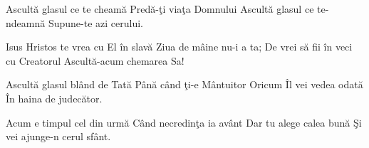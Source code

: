 
\beginverse
Ascultă glasul ce te cheamă
Predă-ţi viaţa Domnului
Ascultă glasul ce te-ndeamnă
Supune-te azi cerului.
\endverse

\beginchorus
Isus Hristos te vrea cu El în slavă
Ziua de mâine nu-i a ta;
De vrei să fii în veci cu Creatorul
Ascultă-acum chemarea Sa!
\endchorus

\beginverse
Ascultă glasul blând de Tată
Până când ţi-e Mântuitor
Oricum Îl vei vedea odată
În haina de judecător.
\endverse

\beginverse
Acum e timpul cel din urmă
Când necredinţa ia avânt
Dar tu alege calea bună
Şi vei ajunge-n cerul sfânt.
\endverse

\endsong